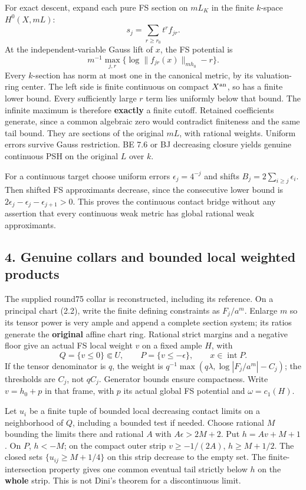\documentclass[
  10pt,
]{article}
\begin{document}
For exact descent, expand each pure FS section on \(mL_K\) in the finite
\(k\)-space \(H^0(X,mL)\): \[s_j=\sum_{r\ge r_0}t^r f_{jr}.\] At the
independent-variable Gauss lift of \(x\), the FS potential is
\[m^{-1}\max_{j,r}\{\log\|f_{jr}(x)\|_{mh_0}-r\}. \tag{3.1}\] Every
\(k\)-section has norm at most one in the canonical metric, by its
valuation-ring center. The left side is finite continuous on compact
\(X^{\rm an}\), so has a finite lower bound. Every sufficiently large
\(r\) term lies uniformly below that bound. The infinite maximum is
therefore \textbf{exactly} a finite cutoff. Retained coefficients
generate, since a common algebraic zero would contradict finiteness and
the same tail bound. They are sections of the original \(mL\), with
rational weights. Uniform errors survive Gauss restriction. BE 7.6 or BJ
decreasing closure yields genuine continuous PSH on the original \(L\)
over \(k\).

For a continuous target choose uniform errors \(\epsilon_j=4^{-j}\) and
shifts \(B_j=2\sum_{i\ge j}\epsilon_i\). Then shifted FS approximants
decrease, since the consecutive lower bound is
\(2\epsilon_j-\epsilon_j-\epsilon_{j+1}>0\). This proves the continuous
contact bridge without any assertion that every continuous weak metric
has global rational weak approximants.

\subsection{4. Genuine collars and bounded local weighted
products}\label{genuine-collars-and-bounded-local-weighted-products}

The supplied round75 collar is reconstructed, including its reference.
On a principal chart (2.2), write the finite defining constraints as
\(F_j/a^m\). Enlarge \(m\) so its tensor power is very ample and append
a complete section system; its ratios generate the \textbf{original}
affine chart ring. Rational strict margins and a negative floor give an
actual FS local weight \(v\) on a fixed ample \(H\), with
\[Q=\{v\le0\}\Subset U,\qquad P=\{v\le-\epsilon\},\qquad x\in\operatorname{int}P.\]
If the tensor denominator is \(q\), the weight is
\(q^{-1}\max(q\lambda,\log|F_j/a^m|-C_j)\); the thresholds are \(C_j\),
not \(qC_j\). Generator bounds ensure compactness. Write \(v=h_0+p\) in
that frame, with \(p\) its actual global FS potential and
\(\omega=c_1(H)\).

Let \(u_i\) be a finite tuple of bounded local decreasing contact limits
on a neighborhood of \(Q\), including a bounded test if needed. Choose
rational \(M\) bounding the limits there and rational \(A\) with
\(A\epsilon>2M+2\). Put \(h=Av+M+1\). On \(P\), \(h<-M\); on the compact
outer strip \(v\ge-1/(2A)\), \(h\ge M+1/2\). The closed sets
\(\{u_{ij}\ge M+1/4\}\) on this strip decrease to the empty set. The
finite-intersection property gives one common eventual tail strictly
below \(h\) on the \textbf{whole} strip. This is not Dini's theorem for
a discontinuous limit.
\end{document}
